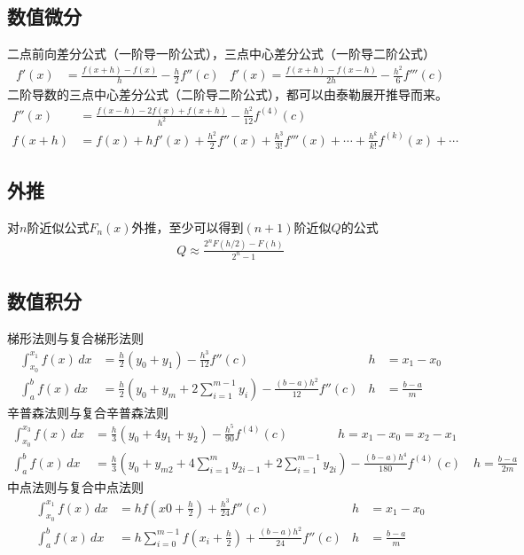 \documentclass[twocolumn]{article}
\begin{document}
\subsection{数值微分}
二点前向差分公式（一阶导一阶公式），三点中心差分公式（一阶导二阶公式）
\begin{align*}
    f'(x) & =\frac{f(x+h)-f(x)}{h}-\frac{h}{2}f''(c) & f'(x)=\frac{f(x+h)-f(x-h)}{2h}-\frac{h^2}{6}f'''(c)
\end{align*}
二阶导数的三点中心差分公式（二阶导二阶公式），都可以由泰勒展开推导而来。
\begin{align*}
    f''(x) & =\frac{f(x-h)-2f(x)+f(x+h)}{h^2}-\frac{h^2}{12}f^{(4)}(c)                                     \\
    f(x+h) & =f(x)+hf'(x)+\frac{h^2}{2}f''(x)+\frac{h^3}{3!}f'''(x)+\cdots+\frac{h^k}{k!}f^{(k)}(x)+\cdots
\end{align*}

\subsection{外推}
对$n$阶近似公式$F_n(x)$外推，至少可以得到$(n+1)$阶近似$Q$的公式
\begin{align*}
    Q \approx \frac{2^nF(h/2)-F(h)}{2^n-1}
\end{align*}

\subsection{数值积分}
梯形法则与复合梯形法则
\begin{align*}
    \int_{x_0}^{x_1} f(x) \,dx & = \frac{h}{2}(y_0+y_1)-\frac{h^3}{12}f''(c)                           & h & =x_1-x_0       \\
    \int_{a}^{b} f(x) \,dx     & = \frac{h}{2}(y_0+y_m+2\sum_{i=1}^{m-1}y_i)-\frac{(b-a)h^2}{12}f''(c) & h & =\frac{b-a}{m}
\end{align*}
辛普森法则与复合辛普森法则
\begin{align*}
    \int_{x_0}^{x_3} f(x) \,dx & = \frac{h}{3}(y_0+4y_1+y_2)-\frac{h^5}{90}f^{(4)}(c) \qquad \qquad h=x_1-x_0=x_2-x_1                                            \\
    \int_{a}^{b} f(x) \,dx     & = \frac{h}{3}(y_0+y_{m2}+4\sum_{i=1}^{m}y_{2i-1}+2\sum_{i=1}^{m-1}y_{2i})-\frac{(b-a)h^4}{180}f^{(4)}(c) \quad h=\frac{b-a}{2m}
\end{align*}
中点法则与复合中点法则
\begin{align*}
    \int_{x_0}^{x_1} f(x) \,dx & =hf(x0+\frac{h}{2})+\frac{h^3}{24}f''(c)                       & h & =x_1-x_0       \\
    \int_{a}^{b} f(x) \,dx     & =h\sum_{i=0}^{m-1}f(x_i+\frac{h}{2})+\frac{(b-a)h^2}{24}f''(c) & h & =\frac{b-a}{m}
\end{align*}
\end{document}

